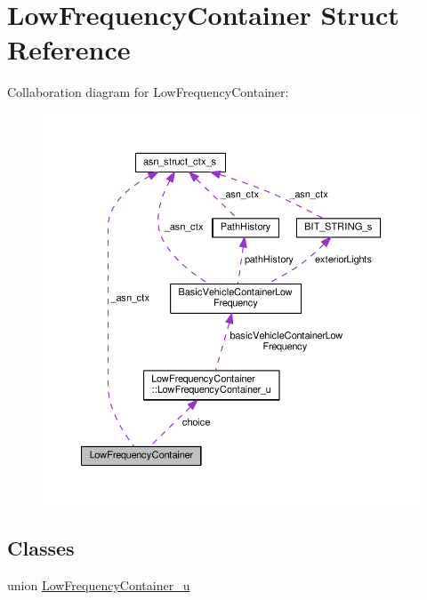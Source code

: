 \hypertarget{structLowFrequencyContainer}{}\section{Low\+Frequency\+Container Struct Reference}
\label{structLowFrequencyContainer}


Collaboration diagram for Low\+Frequency\+Container\+:\nopagebreak
\begin{figure}[H]
\begin{center}
\leavevmode
\includegraphics[width=350pt]{structLowFrequencyContainer__coll__graph}
\end{center}
\end{figure}
\subsection*{Classes}
\begin{DoxyCompactItemize}
\item 
union \hyperlink{unionLowFrequencyContainer_1_1LowFrequencyContainer__u}{Low\+Frequency\+Container\+\_\+u}
\end{DoxyCompactItemize}
